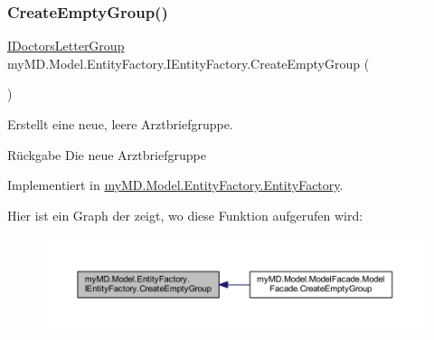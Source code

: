 \subsubsection{\texorpdfstring{Create\+Empty\+Group()}{CreateEmptyGroup()}}
{\footnotesize\ttfamily \mbox{\hyperlink{interfacemy_m_d_1_1_model_interface_1_1_data_model_interface_1_1_i_doctors_letter_group}{I\+Doctors\+Letter\+Group}} my\+M\+D.\+Model.\+Entity\+Factory.\+I\+Entity\+Factory.\+Create\+Empty\+Group (\begin{DoxyParamCaption}{ }\end{DoxyParamCaption})}



Erstellt eine neue, leere Arztbriefgruppe. 

\begin{DoxyReturn}{Rückgabe}
Die neue Arztbriefgruppe
\end{DoxyReturn}


Implementiert in \mbox{\hyperlink{classmy_m_d_1_1_model_1_1_entity_factory_1_1_entity_factory_a0f609feca3acec23373501f96a8f9d69}{my\+M\+D.\+Model.\+Entity\+Factory.\+Entity\+Factory}}.

Hier ist ein Graph der zeigt, wo diese Funktion aufgerufen wird\+:
\nopagebreak
\begin{figure}[H]
\begin{center}
\leavevmode
\includegraphics[width=350pt]{interfacemy_m_d_1_1_model_1_1_entity_factory_1_1_i_entity_factory_afca4ecdc59f292073c7a40d258057484_icgraph}
\end{center}
\end{figure}
\mbox{\label{interfacemy_m_d_1_1_model_1_1_entity_factory_1_1_i_entity_factory_a02bf5fe00d1c0b40dbc510ce74619a33}} 
